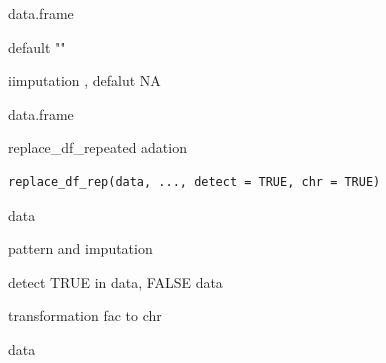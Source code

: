 \documentclass[a4paper]{book}
\begin{document}
%
\begin{Arguments}
\begin{ldescription}
\item[\code{df}] data.frame

\item[\code{pattern}] default ""

\item[\code{imp}] iimputation , defalut NA
\end{ldescription}
\end{Arguments}
%
\begin{Value}
data.frame
\end{Value}
%
\begin{Description}
replace\_df\_repeated adation
\end{Description}
%
\begin{Usage}
\begin{verbatim}
replace_df_rep(data, ..., detect = TRUE, chr = TRUE)
\end{verbatim}
\end{Usage}
%
\begin{Arguments}
\begin{ldescription}
\item[\code{data}] data

\item[\code{...}] pattern and imputation

\item[\code{detect}] detect TRUE in data, FALSE data

\item[\code{chr}] transformation fac  to chr
\end{ldescription}
\end{Arguments}
%
\begin{Value}
data
\end{Value}
%
\end{document}
